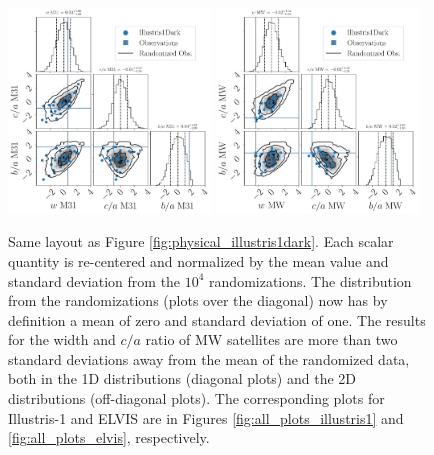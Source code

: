 \documentclass[a4paper,fleqn,usenatbib]{mnras}
\begin{document}
\begin{figure}
\centering
\includegraphics[width=0.48\textwidth]{input_illustris1dark_obs_M31_n_11_normed.pdf}
\includegraphics[width=0.48\textwidth]{input_illustris1dark_obs_MW_n_11_normed.pdf}
\caption{
Same layout as Figure \ref{fig:physical_illustris1dark}. 
  Each scalar
  quantity is re-centered and normalized by the mean value and standard
  deviation from the $10^4$ randomizations. 
  The distribution from the randomizations (plots over the diagonal)
  now has by definition a mean of zero and standard deviation of one. 
The results for the width and $c/a$ ratio of MW satellites are more
than two standard deviations away from the mean of the randomized
data, both in the 1D distributions (diagonal plots) and the 2D
distributions (off-diagonal plots). 
The corresponding plots for Illustris-1 and ELVIS are
in Figures \ref{fig:all_plots_illustris1} and
\ref{fig:all_plots_elvis},
respectively. \label{fig:normalized_illustris1dark}}     
\end{figure}
\end{document}
